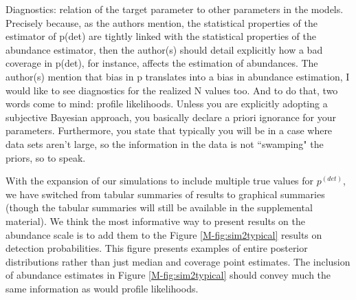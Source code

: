 \documentclass[12pt]{article}
\renewenvironment{quote}  %
              {\list{}{\rightmargin\leftmargin}\normalfont%
               \item\relax}
              {\endlist}
\newcommand{\pdet}{p^{(det)}}
\begin{document}
Diagnostics: relation of the target parameter to other parameters in the models. Precisely because, as the authors mention, the statistical properties of the estimator of p(det) are tightly linked with the statistical properties of the abundance estimator, then the author(s) should detail explicitly how a bad coverage in p(det), for instance, affects the estimation of abundances. The author(s) mention that bias in p translates into a bias in abundance estimation, I would like to see diagnostics for the realized N values too. And to do that, two words come to mind: profile likelihoods. 
Unless you are explicitly adopting a subjective Bayesian approach, you basically declare a priori ignorance for your parameters.  Furthermore, you state that typically you will be in a case where data sets aren't large, so the information in the data is not ``swamping" the priors, so to speak.
\begin{quote}
With the expansion of our simulations to include multiple true values for $\pdet$, we have switched from tabular summaries of results to graphical summaries (though the tabular summaries will still be available in the supplemental material).
We think the most informative way to present results on the abundance scale is to add them to the Figure \ref{M-fig:sim2typical} results on detection probabilities.
This figure presents examples of entire posterior distributions rather than just median and coverage point estimates.
The inclusion of abundance estimates in Figure \ref{M-fig:sim2typical} should convey much the same information as would profile likelihoods.
\end{quote}
\end{document}
